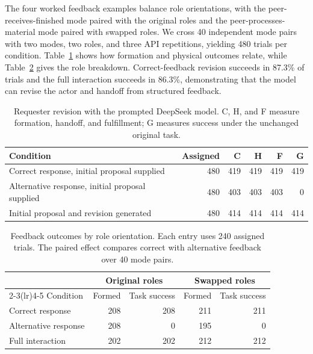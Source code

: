 \documentclass[sigconf,nonacm,balance=false]{aamas}
\newcommand{\tabstyle}{\small\setlength{\tabcolsep}{3pt}\renewcommand{\arraystretch}{1.10}}
\begin{document}
The four worked feedback examples balance role orientations, with the peer-receives-finished mode paired with the original roles and the peer-processes-material mode paired with swapped roles. We cross 40 independent mode pairs with two modes, two roles, and three API repetitions, yielding 480 trials per condition. Table~\ref{tab:prompted-feedback-complete} shows how formation and physical outcomes relate, while Table~\ref{tab:prompted-feedback-role} gives the role breakdown. Correct-feedback revision succeeds in 87.3\% of trials and the full interaction succeeds in 86.3\%, demonstrating that the model can revise the actor and handoff from structured feedback.

\begin{table}[!htbp]
\centering\tabstyle
\caption{Requester revision with the prompted DeepSeek model. C, H, and F measure formation, handoff, and fulfillment; G measures success under the unchanged original task.}
\label{tab:prompted-feedback-complete}
\begin{tabular}{@{}lrrrrr@{}}\toprule
Condition & Assigned & C & H & F & G\\\midrule
Correct response, initial proposal supplied & 480 & 419 & 419 & 419 & 419\\
Alternative response, initial proposal supplied & 480 & 403 & 403 & 403 & 0\\
Initial proposal and revision generated & 480 & 414 & 414 & 414 & 414\\\bottomrule
\end{tabular}
\end{table}

\begin{table}[!htbp]
\centering\tabstyle
\caption{Feedback outcomes by role orientation. Each entry uses 240 assigned trials. The paired effect compares correct with alternative feedback over 40 mode pairs.}
\label{tab:prompted-feedback-role}
\begin{tabular}{@{}lrrrr@{}}\toprule
 & \multicolumn{2}{c}{Original roles} & \multicolumn{2}{c}{Swapped roles}\\
\cmidrule(lr){2-3}\cmidrule(lr){4-5}
Condition & Formed & Task success & Formed & Task success\\\midrule
Correct response & 208 & 208 & 211 & 211\\
Alternative response & 208 & 0 & 195 & 0\\
Full interaction & 202 & 202 & 212 & 212\\\bottomrule
\end{tabular}
\end{table}
\end{document}
